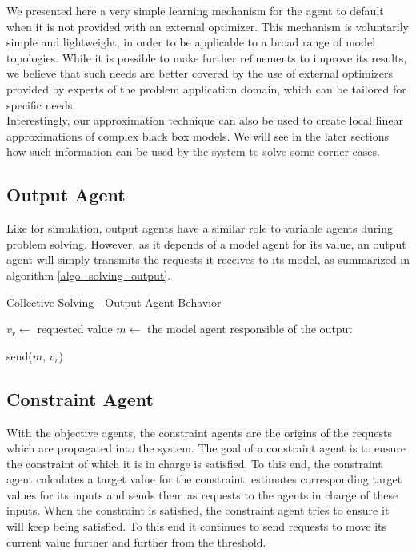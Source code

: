 We presented here a very simple learning mechanism for the agent to default when it is not provided with an external optimizer. This mechanism is voluntarily simple and lightweight, in order to be applicable to a broad range of model topologies. While it is possible to make further refinements to improve its results, we believe that such needs are better covered by the use of external optimizers provided by experts of the problem application domain, which can be tailored for specific needs.\\
Interestingly, our approximation technique can also be used to create local linear approximations of complex black box models. We will see in the later sections how such information can be used by the system to solve some corner cases.

\subsection{Output Agent}

Like for simulation, output agents have a similar role to variable agents during problem solving. However, as it depends of a model agent for its value, an output agent will simply transmits the requests it receives to its model, as summarized in algorithm \ref{algo_solving_output}.

\begin{algorithm}
\caption{Collective Solving - Output Agent Behavior}
\label{algo_solving_output}

	$v_r \leftarrow$ requested value\;
	$m \leftarrow$ the model agent responsible of the output \;
	
	send($m$, $v_r$) \;
	
\end{algorithm}

\subsection{Constraint Agent}

With the objective agents, the constraint agents are the origins of the requests which are propagated into the system. The goal of a constraint agent is to ensure the constraint of which it is in charge is satisfied. To this end, the constraint agent calculates a target value for the constraint, estimates corresponding target values for its inputs and sends them as requests to the agents in charge of these inputs. When the constraint is satisfied, the constraint agent tries to ensure it will keep being satisfied. To this end it continues to send requests to move its current value further and further from the threshold.

